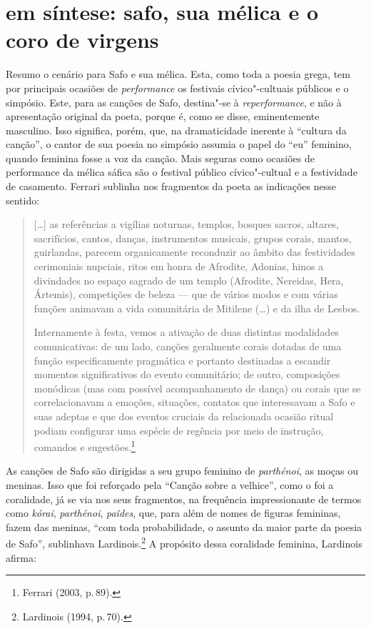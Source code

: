 \section*{em síntese: safo, sua mélica e o coro de virgens}

Resumo o cenário para Safo e sua mélica. Esta, como toda a poesia grega, tem por principais ocasiões de \textit{performance} os festivais cívico"-cultuais públicos e o simpósio. Este, para as canções de Safo, destina"-se à \textit{reperformance}, e não à apresentação original da poeta, porque é, como se disse, eminentemente masculino. Isso significa, porém, que, na dramaticidade inerente à “cultura da canção”, o cantor de sua poesia no simpósio assumia o papel do ``eu'' feminino, quando feminina fosse a voz da canção. Mais seguras como ocasiões de performance da mélica sáfica são o festival público cívico"-cultual e a festividade de casamento. Ferrari sublinha nos fragmentos da poeta as indicações nesse sentido: 

\begin{quote}
[\ldots{}] as referências a vigílias noturnas, templos, bosques sacros, altares, sacrifícios, cantos, danças, instrumentos musicais, grupos corais, mantos, guirlandas, parecem organicamente reconduzir ao âmbito das festividades cerimoniais nupciais, ritos em honra de Afrodite, Adonias, hinos a divindades no espaço sagrado de um templo (Afrodite, Nereidas, Hera, Ártemis), competições de beleza --- que de vários modos e com várias funções animavam a vida comunitária de Mitilene (\ldots{}) e da ilha de Lesbos.
	
Internamente à festa, vemos a ativação de duas distintas modalidades comunicativas: de um lado, canções geralmente corais dotadas de uma função especificamente pragmática e portanto destinadas a escandir momentos significativos do evento comunitário; de outro, composições monódicas (mas com possível acompanhamento de dança) ou corais que se correlacionavam a emoções, situações, contatos que interessavam a Safo e suas adeptas e que dos eventos cruciais da relacionada ocasião ritual podiam configurar uma espécie de regência por meio de instrução, comandos e sugestões.\footnote{Ferrari (2003, p.\,89).}
\end{quote}

As canções de Safo são dirigidas a seu grupo feminino de \textit{parthénoi}, as moças ou meninas. Isso que foi reforçado pela “Canção sobre a velhice”, como o foi a coralidade, já se via nos seus fragmentos, na frequência impressionante de termos como \textit{kórai}, \textit{parthénoi}, \textit{paîdes}, que, para além de nomes de figuras femininas, fazem das meninas, “com toda probabilidade, o assunto da maior parte da poesia de Safo”, sublinhava Lardinois.\footnote{Lardinois (1994, p.\,70).} A propósito dessa coralidade feminina, Lardinois afirma:

